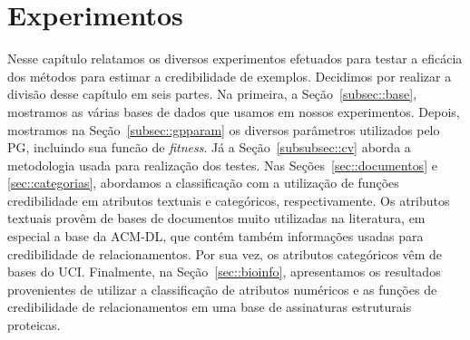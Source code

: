 \newcommand{\triangOK}{\textcolor[rgb]{00,0.45,0.10}{$\blacktriangle$}}
\newcommand{\triangBAD}{\textcolor[rgb]{0.7,00,00}{$\blacktriangledown$}}
\newcommand{\ball}{\textcolor[rgb]{0.7,0.70,0.0}{$\bullet$}}



\chapter{Experimentos}
\label{cap::experimentos}


Nesse capítulo relatamos os diversos experimentos efetuados para testar a eficácia dos métodos para estimar a credibilidade de exemplos. %
Decidimos por realizar a divisão desse capítulo em seis partes.
Na primeira, a Seção~\ref{subsec::base}, mostramos as várias bases de dados que usamos em nossos experimentos.
Depois, mostramos na Seção~\ref{subsec::gpparam} os diversos parâmetros utilizados pelo \textsc{PG}, incluindo sua funcão de \textit{fitness}.
Já a Seção~\ref{subsubsec::cv} aborda a metodologia usada para realização dos testes.
%
Nas Seções~\ref{sec::documentos} e \ref{sec::categorias}, abordamos a classificação com a utilização de funções credibilidade em atributos textuais e categóricos, respectivamente.
Os atributos textuais provêm de bases de documentos muito utilizadas na literatura, em especial a base da \textsc{ACM-DL}, que contém também informações usadas para credibilidade de relacionamentos.
Por sua vez, os atributos categóricos vêm de bases do \textsc{UCI}.
Finalmente, na Seção~\ref{sec::bioinfo}, apresentamos os resultados provenientes de utilizar a classificação de atributos numéricos e as funções de credibilidade de relacionamentos em uma base de assinaturas estruturais proteicas. 





